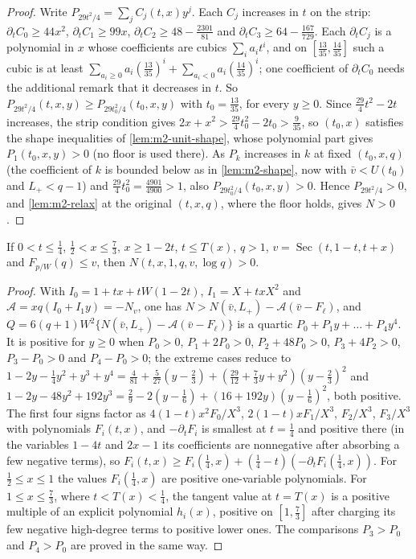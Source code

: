 \begin{proof}
Write $P_{29t^2/4}=\sum_jC_j(t,x)y^j$. Each $C_j$ increases in $t$ on the strip:
$\partial_tC_0\ge44x^2$, $\partial_tC_1\ge99x$, $\partial_tC_2\ge48-\frac{2301}{81}$ and
$\partial_tC_3\ge64-\frac{167}{729}$. Each $\partial_tC_j$ is a polynomial in $x$ whose coefficients
are cubics $\sum_ia_it^i$, and on $[\frac{13}{35},\frac{14}{35}]$ such a cubic is at least
$\sum_{a_i\ge0}a_i(\frac{13}{35})^i+\sum_{a_i<0}a_i(\frac{14}{35})^i$; one coefficient of $\partial_tC_0$
needs the additional remark that it decreases in $t$. So
$P_{29t^2/4}(t,x,y)\ge P_{29t_0^2/4}(t_0,x,y)$ with $t_0=\frac{13}{35}$, for every $y\ge0$.
Since $\frac{29}4t^2-2t$ increases, the strip condition gives
$2x+x^2>\frac{29}4t_0^2-2t_0>\frac9{35}$, so $(t_0,x)$ satisfies the shape inequalities of
\cref{lem:m2-unit-shape}, whose polynomial part gives $P_1(t_0,x,y)>0$ (no floor is used there). As
$P_k$ increases in $k$ at fixed $(t_0,x,q)$ (the coefficient of $k$ is bounded below as in
\cref{lem:m2-shape}, now with $\bar v<U(t_0)$ and $L_+<q-1$) and $\frac{29}4t_0^2=\frac{4901}{4900}>1$,
also $P_{29t_0^2/4}(t_0,x,y)>0$. Hence $P_{29t^2/4}>0$, and \cref{lem:m2-relax} at the original
$(t,x,q)$, where the floor holds, gives $N>0$.
\end{proof}

\begin{lemma}\label{lem:m2-low-unit}
If $0<t\le\frac14$, $\frac12<x\le\frac73$, $x\ge1-2t$, $t\le T(x)$, $q>1$,
$v=\operatorname{Sec}(t,1-t,t+x)$ and $F_{p/W}(q)\le v$, then $N(t,x,1,q,v,\log q)>0$.
\end{lemma}

\begin{proof}
With $I_0=1+tx+tW(1-2t)$, $I_1=X+txX^2$ and $\mathcal A=xq(I_0+I_1y)=-N_v$, one has
$N>N(\bar v,L_+)-\mathcal A(\bar v-F_\ell)$, and
$Q=6(q+1)W^2\{N(\bar v,L_+)-\mathcal A(\bar v-F_\ell)\}$ is a quartic $P_0+P_1y+\dots+P_4y^4$. It is
positive for $y\ge0$ when $P_0>0$, $P_1+2P_0>0$, $P_2+48P_0>0$, $P_3+4P_2>0$, $P_3-P_0>0$ and
$P_4-P_0>0$; the extreme cases reduce to
$1-2y-\frac14y^2+y^3+y^4=\frac4{81}+\frac5{27}(y-\frac23)+(\frac{29}{12}+\frac73y+y^2)(y-\frac23)^2$ and
$1-2y-48y^2+192y^3=\frac29-2(y-\frac16)+(16+192y)(y-\frac16)^2$, both positive. The first four signs
factor as $4(1-t)x^2F_0/X^3$, $2(1-t)xF_1/X^3$, $F_2/X^3$, $F_3/X^3$ with polynomials $F_i(t,x)$, and
$-\partial_tF_i$ is smallest at $t=\frac14$ and positive there (in the variables $1-4t$ and $2x-1$ its
coefficients are nonnegative after absorbing a few negative terms), so
$F_i(t,x)\ge F_i(\frac14,x)+(\frac14-t)(-\partial_tF_i(\frac14,x))$. For $\frac12\le x\le1$ the values
$F_i(\frac14,x)$ are positive one-variable polynomials. For $1\le x\le\frac73$, where
$t<T(x)<\frac14$, the tangent value at $t=T(x)$ is a positive multiple of an explicit polynomial
$h_i(x)$, positive on $[1,\frac73]$ after charging its few negative high-degree terms to positive
lower ones. The comparisons $P_3>P_0$ and $P_4>P_0$ are proved in the same way.
\end{proof}

